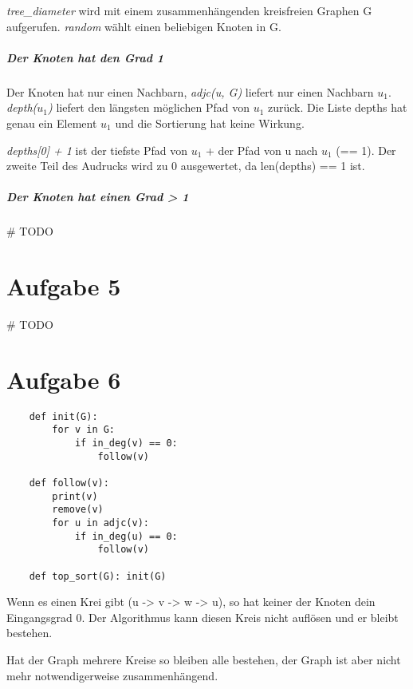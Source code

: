 \documentclass[a4paper,10pt]{scrartcl}
\begin{document}
\emph{tree\_diameter} wird mit einem zusammenhängenden kreisfreien Graphen G aufgerufen.
\emph{random} wählt einen beliebigen Knoten in G.

\subparagraph{Der Knoten hat den Grad 1}

Der Knoten hat nur einen Nachbarn, \emph{adjc(u, G)} liefert nur einen Nachbarn $u_1$.
\emph{depth($u_1$)} liefert den längsten möglichen Pfad von $u_1$ zurück.
Die Liste depths hat genau ein Element $u_1$ und die Sortierung hat keine Wirkung.

\emph{depths[0] + 1} ist der tiefste Pfad von $u_1$ + der Pfad von u nach $u_1$ (== 1).
Der zweite Teil des Audrucks wird zu 0 ausgewertet, da len(depths) == 1 ist.

\subparagraph{Der Knoten hat einen Grad > 1}

\# TODO

\section*{Aufgabe 5}

\# TODO

\section*{Aufgabe 6}

\begin{verbatim}
    def init(G):
        for v in G:
            if in_deg(v) == 0:
                follow(v)

    def follow(v):
        print(v)
        remove(v)
        for u in adjc(v):
            if in_deg(u) == 0:
                follow(v)

    def top_sort(G): init(G)
\end{verbatim}

Wenn es einen Krei gibt (u -> v -> w -> u), so hat keiner der Knoten dein Eingangsgrad 0.
Der Algorithmus kann diesen Kreis nicht auflösen und er bleibt bestehen.

Hat der Graph mehrere Kreise so bleiben alle bestehen, der Graph ist aber nicht mehr notwendigerweise zusammenhängend.
\end{document}
